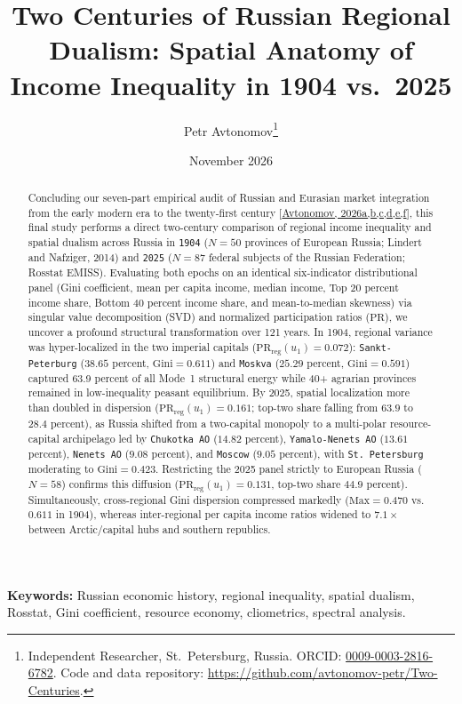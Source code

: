 \documentclass[11pt,a4paper]{article}
\title{\textbf{Two Centuries of Russian Regional Dualism: Spatial Anatomy of Income Inequality in 1904 vs.\ 2025}}
\author{Petr Avtonomov\thanks{Independent Researcher, St.~Petersburg, Russia. ORCID: \href{https://orcid.org}{0009-0003-2816-6782}. Code and data repository: \url{https://github.com/avtonomov-petr/Two-Centuries}.}}
\date{November 2026}
\begin{document}
\maketitle

\begin{abstract}
Concluding our seven-part empirical audit of Russian and Eurasian market integration from the early modern era to the twenty-first century [\href{https://doi.org}{Avtonomov, 2026a,b,c,d,e,f}], this final study performs a direct two-century comparison of regional income inequality and spatial dualism across Russia in \texttt{1904} ($N = 50$ provinces of European Russia; Lindert and Nafziger, 2014) and \texttt{2025} ($N = 87$ federal subjects of the Russian Federation; Rosstat EMISS). Evaluating both epochs on an identical six-indicator distributional panel (Gini coefficient, mean per capita income, median income, Top 20 percent income share, Bottom 40 percent income share, and mean-to-median skewness) via singular value decomposition (SVD) and normalized participation ratios ($\mathrm{PR}$), we uncover a profound structural transformation over 121 years. In 1904, regional variance was hyper-localized in the two imperial capitals ($\mathrm{PR}_{\mathrm{reg}}(u_1) = 0.072$): \texttt{Sankt-Peterburg} ($38.65$ percent, $\mathrm{Gini} = 0.611$) and \texttt{Moskva} ($25.29$ percent, $\mathrm{Gini} = 0.591$) captured 63.9 percent of all Mode~1 structural energy while 40+ agrarian provinces remained in low-inequality peasant equilibrium. By 2025, spatial localization more than doubled in dispersion ($\mathrm{PR}_{\mathrm{reg}}(u_1) = 0.161$; top-two share falling from $63.9$ to $28.4$ percent), as Russia shifted from a two-capital monopoly to a multi-polar resource-capital archipelago led by \texttt{Chukotka AO} ($14.82$ percent), \texttt{Yamalo-Nenets AO} ($13.61$ percent), \texttt{Nenets AO} ($9.08$ percent), and \texttt{Moscow} ($9.05$ percent), with \texttt{St.~Petersburg} moderating to $\mathrm{Gini} = 0.423$. Restricting the 2025 panel strictly to European Russia ($N = 58$) confirms this diffusion ($\mathrm{PR}_{\mathrm{reg}}(u_1) = 0.131$, top-two share $44.9$ percent). Simultaneously, cross-regional Gini dispersion compressed markedly ($\mathrm{Max} = 0.470$ vs.\ $0.611$ in 1904), whereas inter-regional per capita income ratios widened to $7.1\times$ between Arctic/capital hubs and southern republics.
\end{abstract}

\noindent\textbf{Keywords:} Russian economic history, regional inequality, spatial dualism, Rosstat, Gini coefficient, resource economy, cliometrics, spectral analysis.
\end{document}
